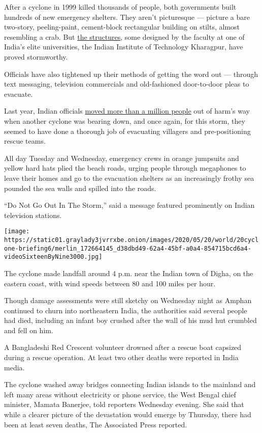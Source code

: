 After a cyclone in 1999 killed thousands of people, both governments
built hundreds of new emergency shelters. They aren't picturesque ---
picture a bare two-story, peeling-paint, cement-block rectangular
building on stilts, almost resembling a crab. But
\href{https://www.telegraphindia.com/states/west-bengal/iit-kharagpur-professors-behind-life-saver-shelters/cid/1690016}{the
structures}, some designed by the faculty at one of India's elite
universities, the Indian Institute of Technology Kharagpur, have proved
stormworthy.

Officials have also tightened up their methods of getting the word out
--- through text messaging, television commercials and old-fashioned
door-to-door pleas to evacuate.

Last year, Indian officials
\href{https://www.nytimes3xbfgragh.onion/2019/05/03/world/asia/cyclone-fani-india-evacuations.html}{moved
more than a million people} out of harm's way when another cyclone was
bearing down, and once again, for this storm, they seemed to have done a
thorough job of evacuating villagers and pre-positioning rescue teams.

All day Tuesday and Wednesday, emergency crews in orange jumpsuits and
yellow hard hats plied the beach roads, urging people through megaphones
to leave their homes and go to the evacuation shelters as an
increasingly frothy sea pounded the sea walls and spilled into the
roads.

``Do Not Go Out In The Storm,'' said a message featured prominently on
Indian television stations.

\texttt{[image: https://static01.graylady3jvrrxbe.onion/images/2020/05/20/world/20cyclone-briefing6/merlin\_172664145\_d38dbd49-62a4-45bf-a0a4-854715bcd6a4-videoSixteenByNine3000.jpg]}

The cyclone made landfall around 4 p.m. near the Indian town of Digha,
on the eastern coast, with wind speeds between 80 and 100 miles per
hour.

Though damage assessments were still sketchy on Wednesday night as
Amphan continued to churn into northeastern India, the authorities said
several people had died, including an infant boy crushed after the wall
of his mud hut crumbled and fell on him.

A Bangladeshi Red Crescent volunteer drowned after a rescue boat
capsized during a rescue operation. At least two other deaths were
reported in India media.

The cyclone washed away bridges connecting Indian islands to the
mainland and left many areas without electricity or phone service, the
West Bengal chief minister, Mamata Banerjee, told reporters Wednesday
evening. She said that while a clearer picture of the devastation would
emerge by Thursday, there had been at least seven deaths, The Associated
Press reported.

